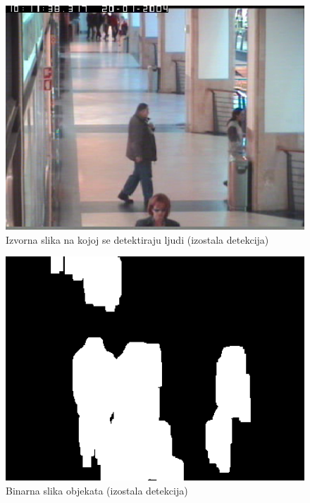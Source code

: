 \documentclass[utf8, seminar, numeric, times]{fer}
\begin{document}
\begin{figure}
\centering
\includegraphics[width=1\textwidth]{otok_original.png}
\caption{Izvorna slika na kojoj se detektiraju ljudi (izostala detekcija)}
\label{lazna_original}
\end{figure}

\begin{figure}
\centering
\includegraphics[width=1\textwidth]{otok_fore.png}
\caption{Binarna slika objekata (izostala detekcija)}
\label{lazna_detekt}
\end{figure}
\end{document}
